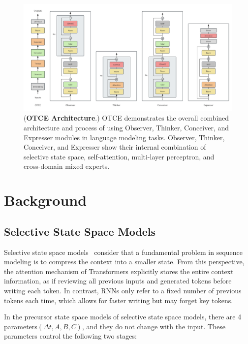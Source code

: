 \documentclass{article}
\theoremstyle{plain}
\theoremstyle{definition}
\theoremstyle{remark}
\begin{document}
\begin{figure}[H]
   \centering
   \includegraphics[width=1.0\linewidth]{fig/otce.png}
   \caption{(\textbf{OTCE Architecture}.) OTCE demonstrates the overall combined architecture and process of using Observer, Thinker, Conceiver, and Expresser modules in language modeling tasks. Observer, Thinker, Conceiver, and Expresser show their internal combination of selective state space, self-attention, multi-layer perceptron, and cross-domain mixed experts.}
   \label{fig:otce}
\end{figure}



\section{Background}
\subsection{Selective State Space Models}


Selective state space models~\cite{gu2023mamba} consider that a fundamental problem in sequence modeling is to compress the context into a smaller state. From this perspective, the attention mechanism of Transformers explicitly stores the entire context information, as if reviewing all previous inputs and generated tokens before writing each token. In contrast, RNNs only refer to a fixed number of previous tokens each time, which allows for faster writing but may forget key tokens.

In the precursor state space models of selective state space models, there are 4 parameters$(\Delta t, A, B, C)$, and they do not change with the input. These parameters control the following two stages:





\end{document}
